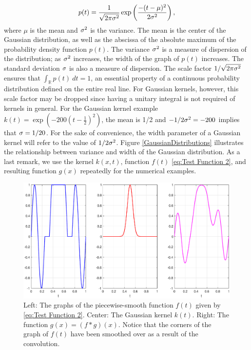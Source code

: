 \begin{equation}
p(t) = \frac{1}{\sqrt{2\pi\sigma^2}}\exp\left(\frac{-(t-\mu)^2}{2\sigma^2}\right),
\label{eq:Gaussian kernel}
\end{equation}
where $\mu$ is the mean and $\sigma^2$ is the variance. The mean is the center of the Gaussian distribution, as well as the abscissa of the absolute maximum of the probability density function $p(t)$. The variance $\sigma^2$ is a measure of dispersion of the distribution; as $\sigma^2$ increases, the width of the graph of $p(t)$ increases. The standard deviation $\sigma$ is also a measure of dispersion. The scale factor $1/\sqrt{2\pi\sigma^2}$ ensures that $\int_{\mathbb{R}} p(t) \: dt = 1$, an essential property of a continuous probability distribution defined on the entire real line. For Gaussian kernels, however, this scale factor may be dropped since having a unitary integral is not required of kernels in general.  For the Gaussian kernel example $k(t) = \exp(-200(t-\frac{1}{2})^2)$, the mean is 1/2 and $-1/2\sigma^2 = -200$ implies that $\sigma = 1/20$. For the sake of convenience, the width parameter of a Gaussian kernel will refer to the value of $1/2\sigma^2$. Figure \ref{GaussianDistributions} illustrates the relationship between variance and width of the Gaussian distribution. As a last remark, we use the kernel $k(x,t)$, function $f(t)$ \eqref{eq:Test Function 2}, and resulting function $g(x)$ repeatedly for the numerical examples.

\begin{figure}
	\centerline{\includegraphics[scale=0.4]{Figures/FunctionKernelPlot.eps}}
\caption{Left: The graphs of the piecewise-smooth function $f(t)$ given by \eqref{eq:Test Function 2}. Center: The Gaussian kernel $k(t)$. Right: The function $g(x) = (f * g)(x)$. Notice that the corners of the graph of $f(t)$ have been smoothed over as a result of the convolution.}
\label{FunctionKernelPlot}
\end{figure}

